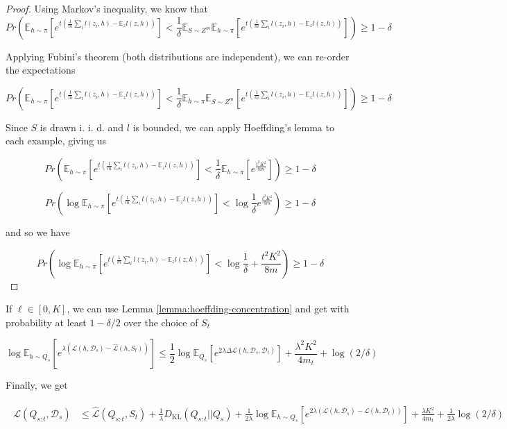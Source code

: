 \documentclass[letterpaper]{article}
\theoremstyle{definition}
\begin{document}
\begin{proof} \label{lemma:hoeffding-concentration}
	Using Markov's inequality, we know that 
	$$Pr\left (\mathbb{E}_{h\sim \pi}\left [e^{t(\frac{1}{m}\sum_i l(z_i,h)-\mathbb{E}_{z}l(z,h))}\right ]<\frac{1}{\delta}\mathbb{E}_{S\sim Z^m}\mathbb{E}_{h\sim \pi}\left [e^{t(\frac{1}{m}\sum_i l(z_i,h)-\mathbb{E}_{z}l(z,h))}\right ] \right ) \geq 1-\delta$$
	
	Applying Fubini's theorem (both distributions are independent), we can re-order the expectations
	
	$$Pr\left (\mathbb{E}_{h\sim \pi}\left [e^{t(\frac{1}{m}\sum_i l(z_i,h)-\mathbb{E}_{z}l(z,h))}\right ]<\frac{1}{\delta}\mathbb{E}_{h\sim \pi}\mathbb{E}_{S\sim Z^m}\left [e^{t(\frac{1}{m}\sum_i l(z_i,h)-\mathbb{E}_{z}l(z,h))}\right ] \right ) \geq 1-\delta$$
	
	Since $S$ is drawn i.\! i.\! d.\! and $l$ is bounded, we can apply Hoeffding's lemma to each example, giving us
	
	$$Pr\left (\mathbb{E}_{h\sim \pi}\left [e^{t(\frac{1}{m}\sum_i l(z_i,h)-\mathbb{E}_{z}l(z,h))}\right ]<\frac{1}{\delta}\mathbb{E}_{h\sim \pi}\left [e^{\frac{t^2K^2}{8m}}\right ] \right ) \geq 1-\delta$$
	
	$$Pr\left (\log\mathbb{E}_{h\sim \pi}\left [e^{t(\frac{1}{m}\sum_i l(z_i,h)-\mathbb{E}_{z}l(z,h))}\right ]<\log\frac{1}{\delta}e^{\frac{t^2K^2}{8m}} \right ) \geq 1-\delta$$
	
	and so we have 
	
	$$Pr\left (\log\mathbb{E}_{h\sim \pi}\left [e^{t(\frac{1}{m}\sum_i l(z_i,h)-\mathbb{E}_{z}l(z,h))}\right ]<\log\frac{1}{\delta}+\frac{t^2K^2}{8m} \right ) \geq 1-\delta$$
	
\end{proof}

If $\ell\in [0,K]$, we can use Lemma \ref{lemma:hoeffding-concentration} and get with probability at least $1-\delta/2$ over the choice of $S_t$


$$\log\mathbb{E}_{h\sim Q_{s}}\left [e^{\lambda(\mathcal{L}(h,\mathcal{D}_s)-\hat{\mathcal{L}}(h,S_t))} \right ]\leq \frac{1}{2}\log\mathbb{E}_{Q_{s}}\left [e^{2\lambda\Delta\mathcal{L}(h,\mathcal{D}_s, \mathcal{D}_t)}\right ]+\frac{\lambda^2K^2}{4m_t}+\log(2/\delta)$$

Finally, we get

\begin{align}
\begin{split}
\mathcal{L}(Q_{s:t}, \mathcal{D}_s) &\leq \hat{\mathcal{L}}(Q_{s:t}, S_t) + \frac{1}{\lambda} D_{\mathrm{KL}}(Q_{s:t}||Q_{s})
+\frac{1}{2\lambda}\log \mathbb{E}_{h\sim Q_{s}}\left [e^{2\lambda(\mathcal{L}(h,\mathcal{D}_s)-\mathcal{L}(h,\mathcal{D}_t))}\right ]+\frac{\lambda K^2}{4m_t}+\frac{1}{2\lambda}\log(2/\delta)
\end{split}
\end{align}
\end{document}
